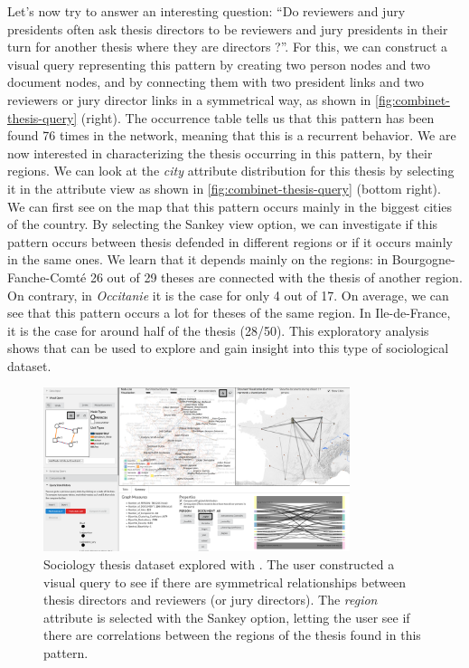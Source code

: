 Let's now try to answer an interesting question: ``Do reviewers and jury presidents often ask thesis directors to be reviewers and jury presidents in their turn for another thesis where they are directors ?''.
For this, we can construct a visual query representing this pattern by creating two person nodes and two document nodes, and by connecting them with two president links and two reviewers or jury director links in a symmetrical way, as shown in \autoref{fig:combinet-thesis-query} (right).
The occurrence table tells us that this pattern has been found 76 times in the network, meaning that this is a recurrent behavior.
We are now interested in characterizing the thesis occurring in this pattern, by their regions.
We can look at the \textit{city} attribute distribution for this thesis by selecting it in the attribute view as shown in \autoref{fig:combinet-thesis-query} (bottom right).
We can first see on the map that this pattern occurs mainly in the biggest cities of the country.
By selecting the Sankey view option, we can investigate if this pattern occurs between thesis defended in different regions or if it occurs mainly in the same ones.
We learn that it depends mainly on the regions: in Bourgogne-Fanche-Comté 26 out of 29 theses are connected with the thesis of another region.
On contrary, in \textit{Occitanie} it is the case for only 4 out of 17.
On average, we can see that this pattern occurs a lot for theses of the same region.
In Ile-de-France, it is the case for around half of the thesis (28/50).
This exploratory analysis shows that \name can be used to explore and gain insight into this type of sociological dataset.

\begin{figure}[!ht]
    \centering
    \includegraphics[width=0.8\textwidth]{static/figures/ComBiNet/Thesis-query01-and-results}
    \caption{Sociology thesis dataset explored with \name. The user constructed a visual query to see if there are symmetrical relationships between thesis directors and reviewers (or jury directors). The \textit{region} attribute is selected with the Sankey option, letting the user see if there are correlations between the regions of the thesis found in this pattern.  }\label{fig:combinet-thesis-query}
\end{figure}

